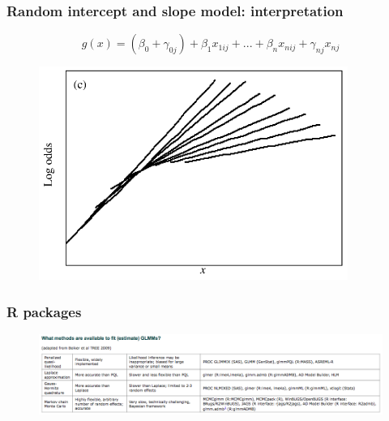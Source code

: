 \documentclass[10pt]{beamer}
\begin{document}
\begin{frame}[fragile]
\frametitle{Random intercept and slope model: interpretation}

$$ g(x) = (\beta_0 + \gamma_{0j}) + \beta_1 x_{1ij} + ... + \beta_n x_{nij} + \gamma_{nj} x_{nj} $$

\begin{figure}
\includegraphics[width=0.8\linewidth]{pictures/randominterceptandslope}
\end{figure}



\end{frame}



\begin{frame}[fragile]
\frametitle{R packages}

\begin{figure}
\includegraphics[width=1.2\linewidth]{pictures/Rpackages}
\end{figure}

\end{frame}
\end{document}
